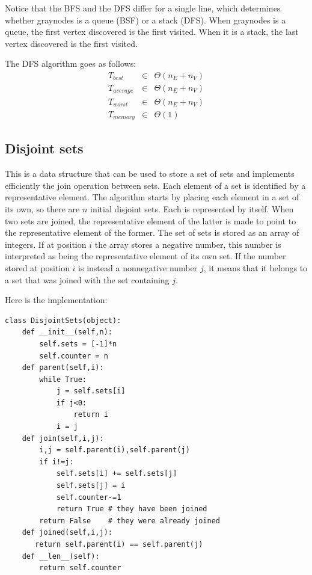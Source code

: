 \documentclass[justified,sixbynine]{tufte-book}
\def\ft{\small\tt}
\theoremstyle{plain}%
\theoremstyle{definition}
\theoremstyle{remark}
\begin{document}
\begin{fullwidth}
Notice that the BFS and the DFS differ for a single line, which determines whether graynodes is a queue (BSF) or a stack (DFS). When graynodes is a queue, the first vertex discovered is the first visited. When it is a stack, the last vertex discovered is the first visited.

The DFS algorithm goes as follows:
\begin{eqnarray}
T_{best} &\in &\Theta (n_E+n_V) \\
T_{average} &\in &\Theta (n_E+n_V) \\
T_{worst} &\in &\Theta (n_E+n_V) \\
T_{memory} &\in &\Theta (1)
\end{eqnarray}

\subsection{Disjoint sets}


This is a data structure that can be used to store a set of sets and implements efficiently the join operation between sets.
Each element of a set is identified by a representative element. The algorithm starts by placing each element in a set of its own, so there are $n$ initial disjoint sets. Each is represented by itself. When two sets are joined, the representative element of the latter is made to point to the representative element of the former. The set of sets is stored as an array of integers. If at position $i$ the array stores a negative number, this number is interpreted as being the representative element of its own set. If the number stored at position $i$ is instead a nonnegative number $j$, it means that it belongs to a set that was joined with the set containing $j$.

Here is the implementation:


\begin{lstlisting}[caption={in file: {\ft nlib.py}}]
class DisjointSets(object):
    def __init__(self,n):
        self.sets = [-1]*n
        self.counter = n
    def parent(self,i):
        while True:
            j = self.sets[i]
            if j<0:
                return i
            i = j
    def join(self,i,j):
        i,j = self.parent(i),self.parent(j)
        if i!=j:
            self.sets[i] += self.sets[j]
            self.sets[j] = i
            self.counter-=1
            return True # they have been joined
        return False    # they were already joined
    def joined(self,i,j):
       return self.parent(i) == self.parent(j)
    def __len__(self):
        return self.counter
\end{lstlisting}


\end{fullwidth}
\end{document}
